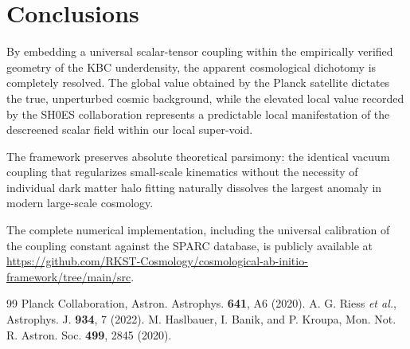 \documentclass[aps,prl,reprint,superscriptaddress,nofootinbib,amsmath,amssymb]{revtex4-2}
\begin{document}
\section{Conclusions}
By embedding a universal scalar-tensor coupling within the empirically verified geometry of the KBC underdensity, the apparent cosmological dichotomy is completely resolved. The global value obtained by the Planck satellite dictates the true, unperturbed cosmic background, while the elevated local value recorded by the SH0ES collaboration represents a predictable local manifestation of the descreened scalar field within our local super-void. 

The framework preserves absolute theoretical parsimony: the identical vacuum coupling that regularizes small-scale kinematics without the necessity of individual dark matter halo fitting naturally dissolves the largest anomaly in modern large-scale cosmology.

\begin{acknowledgments}
The complete numerical implementation, including the universal calibration of the coupling constant against the SPARC database, is publicly available at \url{https://github.com/RKST-Cosmology/cosmological-ab-initio-framework/tree/main/src}.
\end{acknowledgments}


\begin{thebibliography}{99}
 Planck Collaboration, Astron. Astrophys. {\bf 641}, A6 (2020).
 A. G. Riess {\it et al.}, Astrophys. J. {\bf 934}, 7 (2022).
 M. Haslbauer, I. Banik, and P. Kroupa, Mon. Not. R. Astron. Soc. {\bf 499}, 2845 (2020).
\end{thebibliography}
\end{document}
